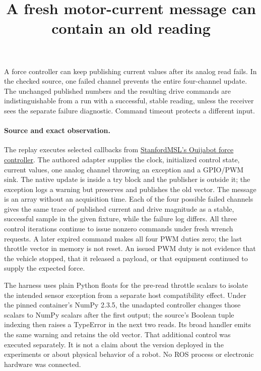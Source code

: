 \documentclass[11pt]{article}
\title{A fresh motor-current message can contain an old reading}
\author{}
\date{}
\begin{document}
\maketitle

A force controller can keep publishing current values after its analog read fails. In the checked source, one failed channel prevents the entire four-channel update. The unchanged published numbers and the resulting drive commands are indistinguishable from a run with a successful, stable reading, unless the receiver sees the separate failure diagnostic. Command timeout protects a different input.

\paragraph{Source and exact observation.}
The replay executes selected callbacks from \href{https://github.com/StanfordMSL/ouijabot/blob/7248d95212123c32c94ef1faaedd2e4907a4d8e1/ouijabot/script/force_control.py}{StanfordMSL's Ouijabot force controller}. The authored adapter supplies the clock, initialized control state, current values, one analog channel throwing an exception and a GPIO/PWM sink. The native update is inside a try block and the publisher is outside it; the exception logs a warning but preserves and publishes the old vector. The message is an array without an acquisition time. Each of the four possible failed channels gives the same trace of published current and drive magnitude as a stable, successful sample in the given fixture, while the failure log differs. All three control iterations continue to issue nonzero commands under fresh wrench requests. A later expired command makes all four PWM duties zero; the last throttle vector in memory is not reset. An issued PWM duty is not evidence that the vehicle stopped, that it released a payload, or that equipment continued to supply the expected force.

The harness uses plain Python floats for the pre-read throttle scalars to isolate the intended sensor exception from a separate host compatibility effect. Under the pinned container's NumPy 2.3.5, the unadapted controller changes those scalars to NumPy scalars after the first output; the source's Boolean tuple indexing then raises a TypeError in the next two reads. Its broad handler emits the same warning and retains the old vector. That additional control was executed separately. It is not a claim about the version deployed in the experiments or about physical behavior of a robot. No ROS process or electronic hardware was connected.
\end{document}
